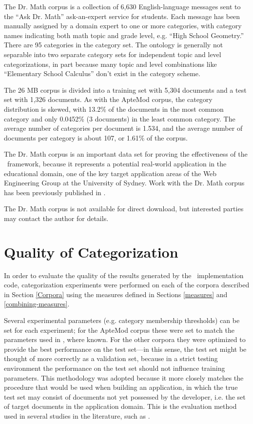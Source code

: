 The Dr. Math corpus is a collection of 6,630 English-language messages
sent to the ``Ask Dr. Math'' ask-an-expert service for
students. \cite{drmath} Each message has been manually assigned by a
domain expert to one or more categories,
with category names indicating both math topic and grade level,
e.g. ``High School Geometry.''  There are 95 categories in the
category set.  The ontology is generally not
separable into two separate category sets for independent topic and
level categorizations, in part because many topic and level
combinations like ``Elementary School Calculus'' don't exist in the
category scheme.

The 26 MB corpus is divided into a training set with 5,304 documents
and a test set with 1,326 documents.  As with the ApteMod corpus, the
category distribution is skewed, with 13.2\% of the documents in the
most common category and only 0.0452\% (3 documents) in the least
common category.  The average number of categories per document is
1.534, and the average number of documents per category is about 107,
or 1.61\% of the corpus.

The Dr. Math corpus is an important data set for proving the
effectiveness of the \aicat\ framework, because it represents a
potential real-world application in the educational domain, one of the key
target application areas of the Web Engineering Group at the
University of Sydney. Work with the Dr. Math corpus has been
previously published in \cite{williams:03}.

The Dr. Math corpus is not available for direct download, but interested
parties may contact the author for details.


\section{Quality of Categorization}
\label{Quality}

In order to evaluate the quality of the results generated by the
\aicat\ implementation code, categorization experiments were performed
on each of the corpora described in Section \ref{Corpora} using the
measures defined in Sections \ref{measures} and
\ref{combining-measures}.

Several
experimental parameters (e.g. category membership thresholds) can be
set for each experiment; for the ApteMod corpus these were set to
match the parameters used in \cite{yang:99}, where known.  For the
other corpora they were optimized to provide the
best performance on the test set---in this sense, the test set might
be thought of more correctly as a validation set, because in a strict
testing environment the performance on the test set should not
influence training parameters.  This methodology was adopted because
it more closely matches the procedure that would be used when building
an application, in which the true test set may consist of documents
not yet possessed by the developer, i.e. the set of target documents
in the application domain.  This is the evaluation method used in
several studies in the literature, such as \cite{joachims:98}.

